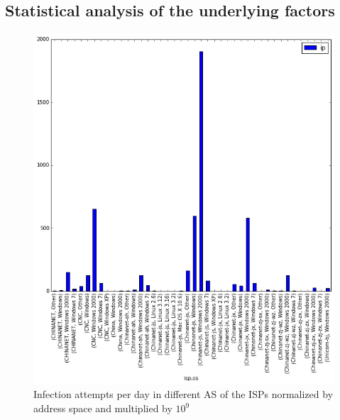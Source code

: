 \subsection{Statistical analysis of the underlying factors}
\begin{figure}[h]
     \caption{Infection attempts per day in different AS of the ISPs normalized by address space and multiplied by $10^9$}
     \label{fig:isp_legend_area}
    \centering
    \includegraphics[width=\linewidth]{images/os_isp}
\end{figure}

